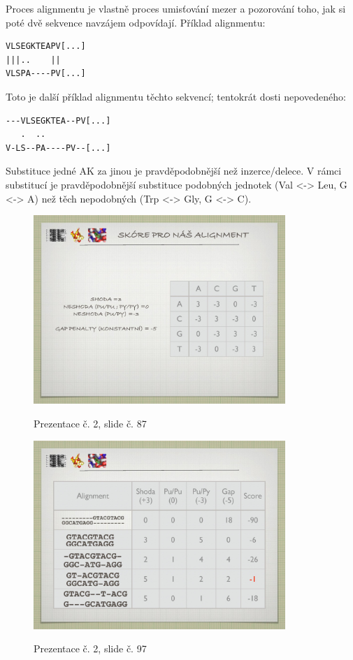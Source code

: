 \documentclass[DIV=8]{scrreprt}
\begin{document}
Proces alignmentu je vlastně proces umisťování mezer a pozorování toho, jak si poté dvě sekvence navzájem odpovídají. Příklad alignmentu:
\begin{lstlisting}
VLSEGKTEAPV[...]
|||..    ||
VLSPA----PV[...]\end{lstlisting}


Toto je další příklad alignmentu těchto sekvencí; tentokrát dosti nepovedeného:
\begin{lstlisting}
---VLSEGKTEA--PV[...]
   .  ..
V-LS--PA----PV--[...]\end{lstlisting}


Substituce jedné AK za jinou je pravděpodobnější než inzerce/delece. V rámci substitucí je pravděpodobnější substituce podobných jednotek (Val <-> Leu, G <-> A) než těch nepodobných (Trp <-> Gly, G <-> C).

\begin{figure}
    \caption{Prezentace č. 2, slide č. 87}
    \includegraphics[width=0.85\textwidth]{slides-2/slide-87.jpg}
    \centering
    \label{slides-2-slide-87}
\end{figure}
\begin{figure}
    \caption{Prezentace č. 2, slide č. 97}
    \includegraphics[width=0.85\textwidth]{slides-2/slide-97.jpg}
    \centering
    \label{slides-2-slide-97}
\end{figure}
\end{document}
